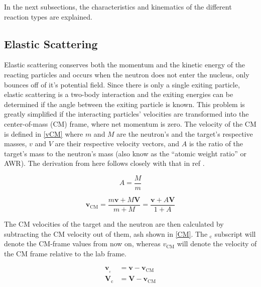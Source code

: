 In the next subsections, the characteristics and kinematics of the different reaction types are explained.

\subsection{Elastic Scattering}

Elastic scattering conserves both the momentum and the kinetic energy of the reacting particles and occurs when the neutron does not enter the nucleus, only bounces off of it's potential field.  Since there is only a single exiting particle, elastic scattering is a two-body interaction and the exiting energies can be determined if the angle between the exiting particle is known.  This problem is greatly simplified if the interacting particles' velocities are transformed into the center-of-mass (CM) frame, where net momentum is zero. The velocity of the CM is defined in \eqref{vCM} where $m$ and $M$ are the neutron's and the target's respective masses, $v$ and $V$ are their respective velocity vectors, and $A$ is the ratio of the target's mass to the neutron's mass (also know as the ``atomic weight ratio'' or AWR).  The derivation from here follows closely with that in ref \cite{jaakko}.

\begin{equation}
A = \frac{M}{m}
\label{AWR}
\end{equation}

\begin{equation}
\boldsymbol{v_{\mathrm{CM}}} = \frac{ m \boldsymbol{v} + M \boldsymbol{V} }    {m+M} = \frac{ \boldsymbol{v} + A \boldsymbol{V} }    {1+A}
\label{vCM}
\end{equation}

The CM velocities of the target and the neutron are then calculated by subtracting the CM velocity out of them, ash shown in \eqref{CM}.  The $_\mathrm{c}$ subscript will denote the CM-frame values from now on, whereas $v_{\mathrm{CM}}$ will denote the velocity of the CM frame relative to the lab frame.

\begin{equation}
\begin{split}
 \boldsymbol{v_{_\mathrm{c}}} &= \boldsymbol{v} - \boldsymbol{v_{\mathrm{CM}}} \\  
 \boldsymbol{V_{\mathrm{c}}} &= \boldsymbol{V} - \boldsymbol{v_{\mathrm{CM}}}
 \end{split}
\label{CM}
\end{equation}

